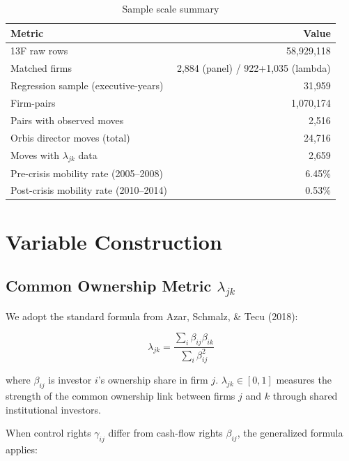 \documentclass[11pt,a4paper]{article}
\begin{document}
\begin{table}[h!]
\centering
\begin{tabular}{lr}
\toprule
\textbf{Metric} & \textbf{Value} \\
\midrule
13F raw rows & 58,929,118 \\
Matched firms & 2,884 (panel) / 922+1,035 (lambda) \\
Regression sample (executive-years) & 31,959 \\
Firm-pairs & 1,070,174 \\
Pairs with observed moves & 2,516 \\
Orbis director moves (total) & 24,716 \\
Moves with \(\lambda_{jk}\) data & 2,659 \\
Pre-crisis mobility rate (2005--2008) & 6.45\% \\
Post-crisis mobility rate (2010--2014) & 0.53\% \\
\bottomrule
\end{tabular}
\caption{Sample scale summary}
\end{table}

\newpage

\section{Variable Construction}

\subsection{Common Ownership Metric \(\lambda_{jk}\)}

We adopt the standard formula from Azar, Schmalz, \& Tecu (2018):

\begin{equation}\label{eq:lambda}
\lambda_{jk} = \frac{\sum_i \beta_{ij} \beta_{ik}}{\sum_i \beta_{ij}^2}
\end{equation}

where \(\beta_{ij}\) is investor \(i\)'s ownership share in firm \(j\). \(\lambda_{jk} \in [0, 1]\) measures the strength of the common ownership link between firms \(j\) and \(k\) through shared institutional investors.

\vspace{0.2cm}

When control rights \(\gamma_{ij}\) differ from cash-flow rights \(\beta_{ij}\), the generalized formula applies:
\end{document}
